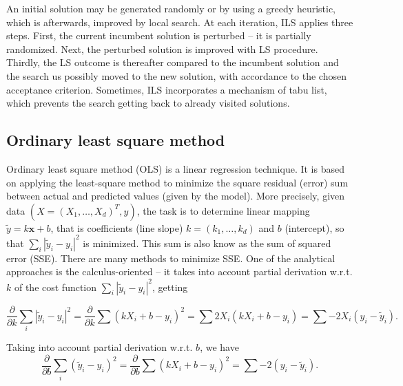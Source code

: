 \documentclass[a4paper,12pt]{elsarticle}
\begin{document}
An initial solution may be generated randomly or by using a greedy heuristic, which is afterwards, improved by local search. At each iteration, ILS applies three steps. First, the current incumbent solution is perturbed -- it is partially randomized. Next, the perturbed solution is improved with LS procedure. Thirdly, the LS outcome is thereafter compared to the incumbent solution and the search us possibly moved to the new solution, with accordance to the chosen acceptance criterion. Sometimes, ILS incorporates a mechanism of tabu list, which prevents the search getting back to already visited solutions. 
   
 \subsection{Ordinary least square method}
   Ordinary least square method (OLS) is a linear regression technique. It is based on applying the least-square method to minimize the square residual (error) sum  between actual and predicted values (given by the model). More precisely, given data $({X}=(X_1, \ldots, X_d)^T, y)$, the task is to determine linear mapping $\tilde{y} = k \textbf{x} + b$, that is coefficients (line slope) $k = (k_1, \ldots, k_d)$ and $b$ (intercept), so that $ \sum_{i} |\tilde{y}_i - y_i|^2 $ is minimized. This sum is also know as the sum of squared error (SSE). There are many methods to minimize SSE. One of the analytical approaches is the calculus-oriented -- it takes into account   partial derivation w.r.t. $k$ of the cost function $ \sum_{i} |\tilde{y}_i - y_i|^2 $, getting 
   
   $$  \frac{\partial}{\partial k} \sum_{i} |\tilde{y}_i - y_i|^2 = \frac{\partial}{\partial k} \sum ( kX_i+b  - y_i)^2 =  \sum 2X_i(kX_i + b - y_i)  =  \sum -2X_i (y_i - \tilde{y}_i) . $$
   
   Taking into account   partial derivation w.r.t.  $b$, we have 
    $$  \frac{\partial}{\partial b} \sum_{i} (\tilde{y}_i - y_i)^2  = \frac{\partial}{\partial b} \sum ( kX_i+b  - y_i)^2 = \sum -2  (y_i - \tilde{y}_i). $$
    
\end{document}
